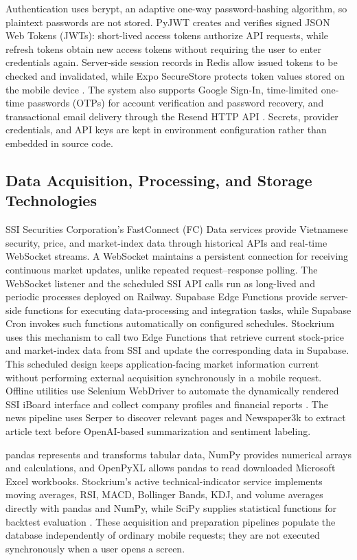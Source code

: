 Authentication uses bcrypt, an adaptive one-way password-hashing algorithm, so plaintext passwords are not stored. PyJWT creates and verifies signed JSON Web Tokens (JWTs): short-lived access tokens authorize API requests, while refresh tokens obtain new access tokens without requiring the user to enter credentials again. Server-side session records in Redis allow issued tokens to be checked and invalidated, while Expo SecureStore protects token values stored on the mobile device \cite{expoSecureStore2026}. The system also supports Google Sign-In, time-limited one-time passwords (OTPs) for account verification and password recovery, and transactional email delivery through the Resend HTTP API \cite{resendApi2026}. Secrets, provider credentials, and API keys are kept in environment configuration rather than embedded in source code.

\subsection{Data Acquisition, Processing, and Storage Technologies}

SSI Securities Corporation's FastConnect (FC) Data services provide Vietnamese security, price, and market-index data through historical APIs and real-time WebSocket streams. A WebSocket maintains a persistent connection for receiving continuous market updates, unlike repeated request--response polling. The WebSocket listener and the scheduled SSI API calls run as long-lived and periodic processes deployed on Railway. Supabase Edge Functions provide server-side functions for executing data-processing and integration tasks, while Supabase Cron invokes such functions automatically on configured schedules. Stockrium uses this mechanism to call two Edge Functions that retrieve current stock-price and market-index data from SSI and update the corresponding data in Supabase. This scheduled design keeps application-facing market information current without performing external acquisition synchronously in a mobile request. Offline utilities use Selenium WebDriver to automate the dynamically rendered SSI iBoard interface and collect company profiles and financial reports \cite{seleniumWebDriver2025}. The news pipeline uses Serper to discover relevant pages and Newspaper3k to extract article text before OpenAI-based summarization and sentiment labeling.

pandas represents and transforms tabular data, NumPy provides numerical arrays and calculations, and OpenPyXL allows pandas to read downloaded Microsoft Excel workbooks. Stockrium's active technical-indicator service implements moving averages, RSI, MACD, Bollinger Bands, KDJ, and volume averages directly with pandas and NumPy, while SciPy supplies statistical functions for backtest evaluation \cite{pandasIO2026}. These acquisition and preparation pipelines populate the database independently of ordinary mobile requests; they are not executed synchronously when a user opens a screen.

